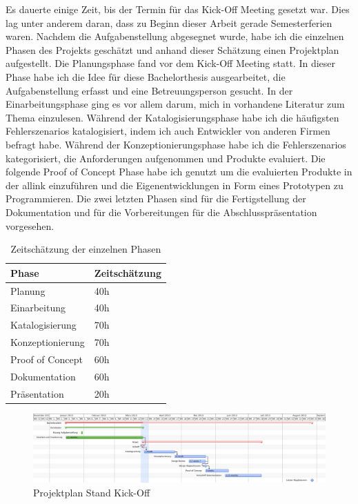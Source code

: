 
Es dauerte einige Zeit, bis der Termin für das Kick-Off Meeting gesetzt war. Dies lag unter anderem daran, dass zu Beginn dieser Arbeit gerade Semesterferien waren. Nachdem die Aufgabenstellung abgesegnet wurde, habe ich die einzelnen Phasen des Projekts geschätzt und anhand dieser Schätzung einen Projektplan aufgestellt. Die Planungsphase fand vor dem Kick-Off Meeting statt. In dieser Phase habe ich die Idee für diese Bachelorthesis ausgearbeitet, die Aufgabenstellung erfasst und eine Betreuungsperson gesucht. In der Einarbeitungsphase ging es vor allem darum, mich in vorhandene Literatur zum Thema einzulesen. Während der Katalogisierungsphase habe ich die häufigsten Fehlerszenarios katalogisiert, indem ich auch Entwickler von anderen Firmen befragt habe. Während der Konzeptionierungsphase habe ich die Fehlerszenarios kategorisiert, die Anforderungen aufgenommen und Produkte evaluiert. Die folgende Proof of Concept Phase habe ich genutzt um die evaluierten Produkte in der allink einzuführen und die Eigenentwicklungen in Form eines Prototypen zu Programmieren. Die zwei letzten Phasen sind für die Fertigstellung der Dokumentation und für die Vorbereitungen für die Abschlusspräsentation vorgesehen.

\begin{table}[h]
  \centering
  \begin{tabular}{ll}
  \toprule
    \textbf{Phase} & \textbf{Zeitschätzung}\\
  \hline
    Planung & 40h\\
  \hline
    Einarbeitung & 40h\\
  \hline
    Katalogisierung & 70h\\
  \hline
    Konzeptionierung & 70h\\
  \hline
    Proof of Concept & 60h\\
  \hline
    Dokumentation & 60h\\
  \hline
    Präsentation & 20h\\
  \bottomrule
  \end{tabular}
  \caption{Zeitschätzung der einzelnen Phasen}
  \label{tab:zeitschätzung}
\end{table}


\begin{figure}[p]
\centering
\includegraphics[width=1\textheight, angle=90]{images/projektplan.pdf}
\caption{Projektplan Stand Kick-Off}
\label{fig:projektplan}
\end{figure}

